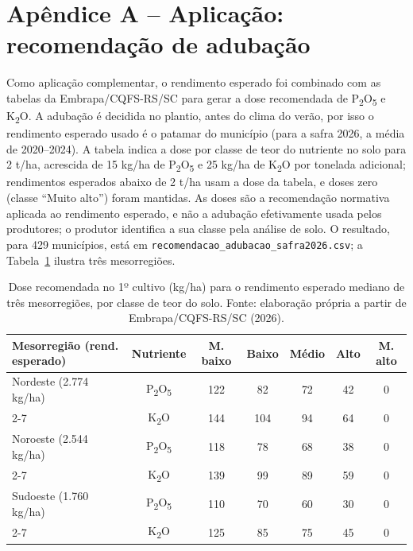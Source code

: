\documentclass[12pt]{article}
\begin{document}
\section*{Apêndice A -- Aplicação: recomendação de adubação}

Como aplicação complementar, o rendimento esperado foi combinado com as
tabelas da Embrapa/CQFS-RS/SC \cite{reuniao2014,sbcs2016} para gerar a
dose recomendada de P\textsubscript{2}O\textsubscript{5} e
K\textsubscript{2}O. A adubação é decidida no plantio, antes do clima do
verão, por isso o rendimento esperado usado é o patamar do município (para
a safra 2026, a média de 2020--2024). A tabela indica a dose por classe de
teor do nutriente no solo para 2 t/ha, acrescida de 15 kg/ha de
P\textsubscript{2}O\textsubscript{5} e 25 kg/ha de K\textsubscript{2}O
por tonelada adicional; rendimentos esperados abaixo de 2 t/ha usam a
dose da tabela, e doses zero (classe ``Muito alto'') foram mantidas. As
doses são a recomendação normativa aplicada ao rendimento esperado, e não
a adubação efetivamente usada pelos produtores; o produtor identifica a
sua classe pela análise de solo. O resultado, para 429 municípios, está
em \texttt{recomendacao\_adubacao\_safra2026.csv}; a
Tabela~\ref{tab:adubacao} ilustra três mesorregiões.

\begin{table}[ht]
\centering
\caption{Dose recomendada no 1º cultivo (kg/ha) para o rendimento
  esperado mediano de três mesorregiões, por classe de teor do solo.
  Fonte: elaboração própria a partir de Embrapa/CQFS-RS/SC (2026).}
\label{tab:adubacao}
\begin{tabular}{|p{3.6cm}|c|c|c|c|c|c|}
\hline
\textbf{Mesorregião (rend. esperado)} & \textbf{Nutriente} &
  \textbf{M. baixo} & \textbf{Baixo} & \textbf{Médio} & \textbf{Alto} &
  \textbf{M. alto} \\ \hline
Nordeste (2.774 kg/ha) & P\textsubscript{2}O\textsubscript{5} & 122 & 82
  & 72 & 42 & 0 \\ \cline{2-7}
 & K\textsubscript{2}O & 144 & 104 & 94 & 64 & 0 \\ \hline
Noroeste (2.544 kg/ha) & P\textsubscript{2}O\textsubscript{5} & 118 & 78
  & 68 & 38 & 0 \\ \cline{2-7}
 & K\textsubscript{2}O & 139 & 99 & 89 & 59 & 0 \\ \hline
Sudoeste (1.760 kg/ha) & P\textsubscript{2}O\textsubscript{5} & 110 & 70
  & 60 & 30 & 0 \\ \cline{2-7}
 & K\textsubscript{2}O & 125 & 85 & 75 & 45 & 0 \\ \hline
\end{tabular}
\end{table}
\end{document}
